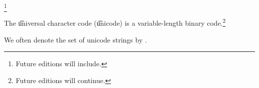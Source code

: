 
\footnote{Future editions will include.}


The \t{universal character code} (\t{unicode}) is a variable-length binary code.\footnote{Future editions will continue.}


We often denote the set of unicode strings by \ustring.

\blankpage
